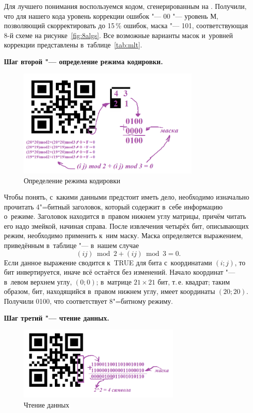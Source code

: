 \documentclass[final,pdftex]{../../template/epsilonj}
\begin{document}
Для лучшего понимания воспользуемся кодом, сгенерированным на \href{http://qrcoder.ru}{}. Получили, что для нашего кода уровень коррекции ошибок "--- 00 "--- уровень М, позволяющий скорректировать до 15\,\% ошибок, маска "--- 101, соответствующая 8-й схеме на рисунке~\ref{fig:8algs}. Все возможные варианты масок и~уровней коррекции представлены в~таблице~\ref{tab:mlt}.

\textbf{Шаг второй "--- определение режима кодировки.}
\begin{figure}[hbt]
	\includegraphics[width=90mm]{21.png}
	\caption{Определение режима кодировки}
\end{figure}

Чтобы понять, с~какими данными предстоит иметь дело, необходимо изначально прочитать 4"=битный заголовок, который содержит в~себе информацию о~режиме. Заголовок находится в~правом нижнем углу матрицы, причём читать его надо змейкой, начиная справа. После извлечения четырёх бит, описывающих режим, необходимо применить к~ним маску. Маска определяется выражением, приведённым в~таблице "--- в~нашем случае
\[
(i j) \bmod 2 + (i j) \bmod 3 = 0.
\]
Если данное выражение сводится к~\textsf{TRUE} для бита с~координатами $(i;j)$, то бит инвертируется, иначе всё остаётся без изменений. Начало координат "--- в~левом верхнем углу, $(0;0)$; в~матрице $21\times21$ бит, т.\,е. квадрат; таким образом, бит, находящийся в~правом нижнем углу, имеет координаты $(20;20)$. Получили 0100, что соответствует 8"=битному режиму.

\textbf{Шаг третий "--- чтение данных.}
\begin{figure}[hbt]
	\includegraphics[width=80mm]{31.png}
	\caption{Чтение данных}
\end{figure}
\end{document}
